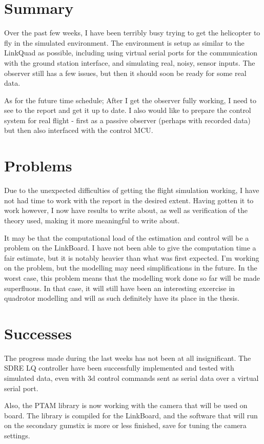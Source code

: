 \section{Summary}
Over the past few weeks, I have been terribly busy trying to get the
helicopter to fly in the simulated environment.
The environment is setup as similar to the LinkQuad as possible, including
using virtual serial ports for the communication with the ground station interface,
and simulating real, noisy, sensor inputs. The observer still has a few issues, but then
it should soon be ready for some real data.

As for the future time schedule; After I get the observer fully working,
I need to see to the report and get it up to date. I also would like to prepare
the control system for real flight - first as a passive observer (perhaps with recorded data)
but then also interfaced with the control MCU.

\section{Problems}
Due to the unexpected difficulties of getting the flight simulation working,
I have not had time to work with the report in the desired extent.
Having gotten it to work however, I now have results to write about, as well
as verification of the theory used, making it more meaningful to write about.

It may be that the computational load of the estimation and control will be
a problem on the LinkBoard. I have not been able to give the computation time
a fair estimate, but it is notably heavier than what was first expected.
I'm working on the problem, but the modelling may need simplifications in the
future. In the worst case, this problem means that the modelling work done
so far will be made superfluous. In that case, it will still have been an
interesting excercise in quadrotor modelling and will as such definitely have its place
in the thesis.

\section{Successes}
The progress made during the last weeks has not been at all insignificant.
The SDRE LQ controller have been successfully implemented and tested with simulated data,
even with 3d control commands sent as serial data over a virtual serial port.

Also, the PTAM library is now working with the camera that will be used on board.
The library is compiled for the LinkBoard, and the software that will run on
the secondary gumstix is more or less finished, save for tuning the camera settings.
